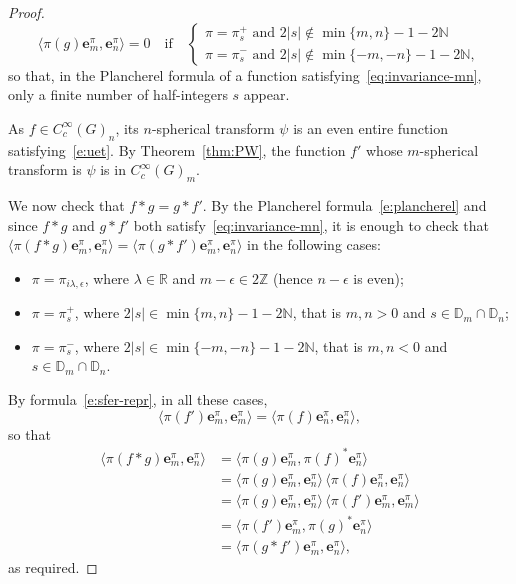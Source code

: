 \documentclass[12pt,a4paper]{amsart}
\theoremstyle{definition}
\theoremstyle{remark}
\numberwithin{equation}{section}
\newcommand{\R}{\mathbb{R}}
\newcommand{\Z}{\mathbb{Z}}
\newcommand{\Discr}{\mathbb{D}_m}
\newcommand{\eb}{\mathbf{e}}
\newcommand{\var}{s}
\begin{document}
\begin{proof}
%
\[
\langle \pi(g)\eb^\pi_m,\eb^\pi_n\rangle=0 \quad
\text{if}\quad
\begin{cases}
\pi=\pi_\var^+ \text{ and } 2|\var|\not\in \min\{m,n\}-1-2\mathbb N
\\[3pt]
\pi=\pi_\var^- \text{ and } 2|\var|\not\in\min\{-m,-n\}-1-2\mathbb N,
\end{cases} 
\]
so that, in the Plancherel formula of a function 
satisfying~\eqref{eq:invariance-mn}, only a finite number of half-integers $\var$ appear.

As  $f \in C^\infty_c(G)_n$, its $n$-spherical transform $\psi$ is an even entire function satisfying~\eqref{e:uet}. 
By Theorem~\ref{thm:PW}, the function $f'$ whose $m$-spherical transform is $\psi$
is in $C^\infty_c(G)_m$. 

We now check that $f*g=g*f'$. By the Plancherel formula~\eqref{e:plancherel} and 
since  $f*g$ and $g*f'$ both satisfy~\eqref{eq:invariance-mn}, it is enough to check that
$\langle \pi(f*g)\eb^\pi_m,\eb^\pi_n\rangle=\langle \pi(g*f')\eb^\pi_m,\eb^\pi_n\rangle$
in the following cases:
\begin{itemize}
\item $\pi=\pi_{i\lambda,\epsilon}$, where $\lambda\in \R $
and $m-\epsilon \in 2\Z$ (hence $n-\epsilon$ is even);
\item 
$\pi=\pi^+_s$, where $2|s|\in \min\{m,n\}-1-2\mathbb N$, that is $m,n>0$ and $s\in \Discr\cap{\mathbb{D}_n}$;
\item $\pi=\pi^-_s$, where $2|s| \in\min\{-m,-n\}-1-2\mathbb N$, that is $m,n<0$ and $s\in \Discr\cap{\mathbb{D}_n}$.
\end{itemize}

By formula~\eqref{e:sfer-repr}, 
in all these cases,  \[
\langle \pi(f')\eb^\pi_m, \eb^\pi_m\rangle=
\langle \pi(f)\eb^\pi_n, \eb^\pi_n\rangle,
\]
so that 
\begin{align*}
\langle \pi(f*g)\eb^\pi_m,\eb^\pi_n\rangle
&=\langle \pi(g)\eb^\pi_m,\pi(f)^*\eb^\pi_n\rangle
\\
&=\langle \pi(g)\eb^\pi_m,\eb^\pi_n\rangle\, \langle \pi(f)\eb^\pi_n, \eb^\pi_n\rangle
\\
&=\langle \pi(g)\eb^\pi_m,\eb^\pi_n\rangle\, \langle \pi(f')\eb^\pi_m, \eb^\pi_m\rangle 
\\
&=\langle \pi(f')\eb^\pi_m,\pi(g)^*\eb^\pi_n\rangle
\\
&=\langle \pi(g*f')\eb^\pi_m,\eb^\pi_n\rangle ,
\end{align*}
as required.
\end{proof}
\end{document}
